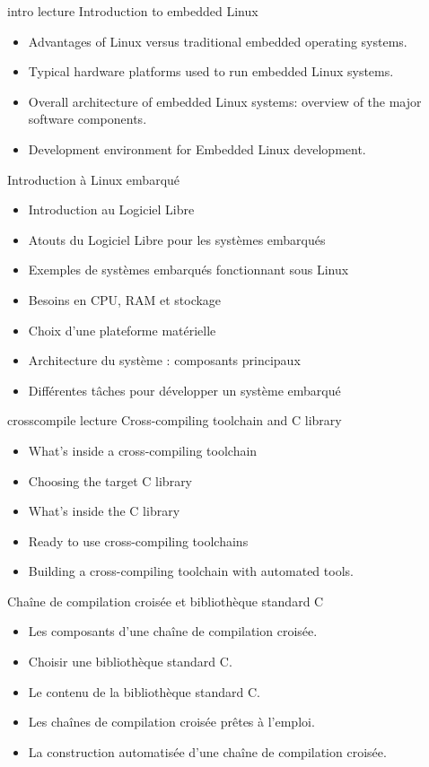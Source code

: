 \def \onsitelecturetimeratio{50}
\def \onsitelabtimeratio{50}



{intro}
{lecture}
{Introduction to embedded Linux}
{
  \begin{itemize}
  \item Advantages of Linux versus traditional embedded operating
    systems.
  \item Typical hardware platforms used to run embedded Linux systems.
  \item Overall architecture of embedded Linux systems: overview of
    the major software components.
  \item Development environment for Embedded Linux development.
  \end{itemize}
}
{Introduction à Linux embarqué}
{
  \begin{itemize}
  \item Introduction au Logiciel Libre
  \item Atouts du Logiciel Libre pour les systèmes embarqués
  \item Exemples de systèmes embarqués fonctionnant sous Linux
  \item Besoins en CPU, RAM et stockage
  \item Choix d'une plateforme matérielle
  \item Architecture du système : composants principaux
  \item Différentes tâches pour développer un système embarqué
  \end{itemize}
}
{crosscompile}
{lecture}
{Cross-compiling toolchain and C library}
{
  \begin{itemize}
  \item What's inside a cross-compiling toolchain
  \item Choosing the target C library
  \item What's inside the C library
  \item Ready to use cross-compiling toolchains
  \item Building a cross-compiling toolchain with automated tools.
  \end{itemize}
}
{Chaîne de compilation croisée et bibliothèque standard C}
{
  \begin{itemize}
  \item Les composants d'une chaîne de compilation croisée.
  \item Choisir une bibliothèque standard C.
  \item Le contenu de la bibliothèque standard C.
  \item Les chaînes de compilation croisée prêtes à l'emploi.
  \item La construction automatisée d'une chaîne de compilation croisée.
  \end{itemize}
}

